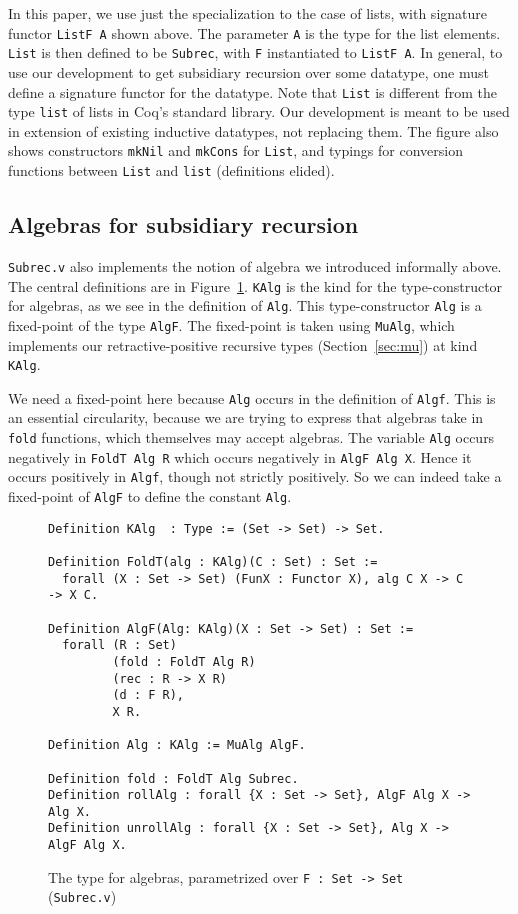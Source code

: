 \documentclass[a4paper,USenglish]{lipics-v2021}
\begin{document}
In this paper, we use just the specialization to the case of lists,
with signature functor \verb|ListF A| shown above.  The parameter
\verb|A| is the type for the list elements.  \verb|List| is then
defined to be \verb|Subrec|, with \verb|F| instantiated to
\verb|ListF A|. In general, to use our development to get subsidiary
recursion over some datatype, one must define a signature functor for
the datatype.  Note that \verb|List| is different from the type
\verb|list| of lists in Coq's standard library.  Our development is
meant to be used in extension of existing inductive datatypes, not
replacing them.  The figure also shows constructors \verb|mkNil| and
\verb|mkCons| for \verb|List|, and typings for conversion functions
between \verb|List| and \verb|list| (definitions elided).
  

\subsection{Algebras for subsidiary recursion}

\verb|Subrec.v| also implements the notion of algebra we introduced
informally above.  The central definitions are in
Figure~\ref{fig:algf}.  \verb|KAlg| is the kind for the
type-constructor for algebras, as we see in the definition of
\verb|Alg|.  This type-constructor \verb|Alg| is a fixed-point of the
type \verb|AlgF|.  The fixed-point is taken using \verb|MuAlg|, which
implements our retractive-positive recursive types
(Section~\ref{sec:mu}) at kind \verb|KAlg|.  

We need a fixed-point here because \verb|Alg| occurs in the definition
of \verb|Algf|.  This is an essential circularity, because we are
trying to express that algebras take in \verb|fold| functions, which
themselves may accept algebras.  The variable \verb|Alg| occurs
negatively in \verb|FoldT Alg R| which occurs negatively in
\verb|AlgF Alg X|.  Hence it occurs positively in \verb|Algf|, though not strictly
positively.  So we can indeed take a fixed-point of \verb|AlgF| to
define the constant \verb|Alg|.

\begin{figure}
\begin{verbatim}
Definition KAlg  : Type := (Set -> Set) -> Set.

Definition FoldT(alg : KAlg)(C : Set) : Set :=
  forall (X : Set -> Set) (FunX : Functor X), alg C X -> C -> X C.

Definition AlgF(Alg: KAlg)(X : Set -> Set) : Set :=
  forall (R : Set)
         (fold : FoldT Alg R)
         (rec : R -> X R)      
         (d : F R),             
         X R.

Definition Alg : KAlg := MuAlg AlgF.

Definition fold : FoldT Alg Subrec.
Definition rollAlg : forall {X : Set -> Set}, AlgF Alg X -> Alg X.
Definition unrollAlg : forall {X : Set -> Set}, Alg X -> AlgF Alg X.
\end{verbatim}
\caption{The type for algebras, parametrized over \texttt{F : Set -> Set} (\texttt{Subrec.v})}
\label{fig:algf}
\end{figure}
\end{document}
